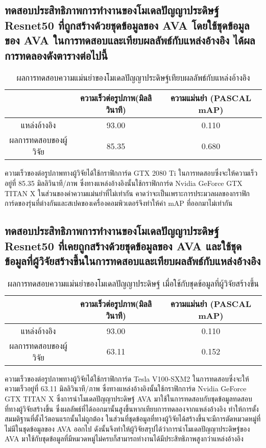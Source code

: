 \subsection{ทดสอบประสิทธิภาพการทำงานของโมเดลปัญญาประดิษฐ์ Resnet50 ที่ถูกสร้างด้วยชุดข้อมูลของ AVA โดยใช้ชุดข้อมูลของ AVA ในการทดสอบและเทียบผลลัพธ์กับแหล่งอ้างอิง ได้ผลการทดลองดังตารางต่อไปนี้}
\begin{table}[!ht]
	\centering
	\begin{tabular}{|c|c|c|}
			\hline
			{}&{ความเร็วต่อรูปภาพ(มิลลิวินาที)}&{ความแม่นยำ (PASCAL mAP)}			\\
			\hline
			แหล่งอ้างอิง	 					& 93.00		& 0.110				\\
			ผลการทดสอบของผู้วิจัย				& 85.35  	& 0.680				\\
			\hline
	\end{tabular}
\caption{ผลการทดสอบความแม่นยำของโมเดลปัญญาประดิษฐ์เทียบผลลัพธ์กับแหล่งอ้างอิง}
\label{tab: Compare PASCAL mAP with source}
\end{table}
ความเร็วของต่อรูปภาพทางผู้วิจัยได้ใช้กราฟิกการ์ด GTX 2080 Ti ในการทดสอบซึ่งจะให้ความเร็วอยู่ที่ 85.35 มิลลิวินาที/ภาพ ซึ่งทางแหล่งอ้างอิงนั้นใช้กราฟิกการ์ด Nvidia GeForce GTX TITAN X 
ในส่วนของค่าความแม่นยำที่ไม่เท่ากัน คาดว่าจะเป็นเพราะการประมวลผลของกราฟิกการ์ดของรุ่นที่ต่างกันและสเปคของเครื่องคอมพิวเตอร์จึงทำให้ค่า mAP ที่ออกมาไม่เท่ากัน

\subsection{ทดสอบประสิทธิภาพการทำงานของโมเดลปัญญาประดิษฐ์ Resnet50 ที่เคยถูกสร้างด้วยชุดข้อมูลของ AVA และใช้ชุดข้อมูลที่ผู้วิจัยสร้างขึ้นในการทดสอบและเทียบผลลัพธ์กับแหล่งอ้างอิง}
\begin{table}[!ht]
	\centering
	\begin{tabular}{|c|c|c|}
			\hline
			{}&{ความเร็วต่อรูปภาพ(มิลลิวินาที)}&{ความแม่นยำ (PASCAL mAP)}			\\
			\hline
			แหล่งอ้างอิง	 					& 93.00			& 0.110			\\
			ผลการทดสอบของผู้วิจัย				& 63.11			& 0.152			\\
			\hline
	\end{tabular}
\caption{ผลการทดสอบความแม่นยำของโมเดลปัญญาประดิษฐ์ เมื่อใช้กับชุดข้อมูลที่ผู้วิจัยสร้างขึ้น}
\label{tab: Compare PASCAL mAP with dataset created by the researcher}
\end{table}
ความเร็วของต่อรูปภาพทางผู้วิจัยได้ใช้กราฟิกการ์ด Tesla V100-SXM2 ในการทดสอบซึ่งจะให้ความเร็วอยู่ที่ 63.11 มิลลิวินาที/ภาพ ซึ่งทางแหล่งอ้างอิงนั้นใช้กราฟิกการ์ด Nvidia GeForce GTX TITAN X ซึ่งการนำโมเดลปัญญาประดิษฐ์ AVA มาใช้ในการทดสอบกับชุดข้อมูลทดสอบที่ทางผู้วิจัยสร้างขึ้น ซึ่งผลลัพธ์ที่ได้ออกมานั้นสูงขึ้นหากเทียบการทดลองจากแหล่งอ้างอิง ทำให้การตั้งสมมติฐานที่ตั้งไว้ตอนแรกนั้นไม่ถูกต้อง ในส่วนที่ชุดข้อมูลที่ทางผู้วิจัยได้สร้างขึ้นจะมีการตัดหมวดหมู่ที่ไม่มีในชุดข้อมูลของ AVA ออกไป ดังนั้นจึงทำให้ผู้วิจัยสรุปได้ว่าการนำโมเดลปัญญาประดิษฐ์ของ AVA มาใช้กับชุดข้อมูลที่มีหมวดหมู่ไม่ครบก็สามารถทำงานได้มีประสิทธิภาพสูงกว่าแหล่งอ้างอิง
\clearpage
